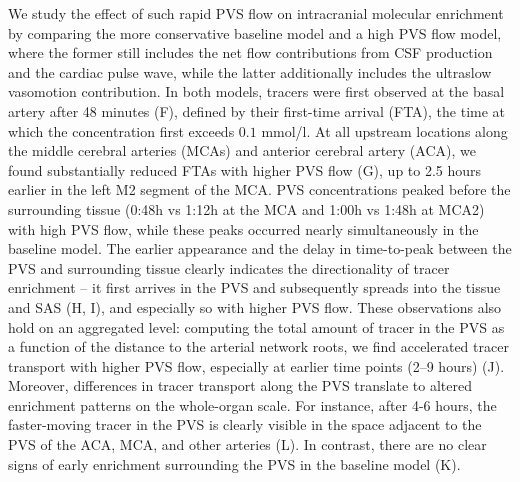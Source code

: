 \documentclass[fleqn,10pt]{wlscirep}
\begin{document}
We study the effect of such rapid PVS flow on intracranial molecular
enrichment by comparing the more conservative baseline model and a
high PVS flow model, where the former still includes the net flow
contributions from CSF production and the cardiac pulse wave, while
the latter additionally includes the ultraslow vasomotion
contribution. In both models, tracers were first observed at the basal
artery after 48 minutes (F), defined by their first-time
arrival (FTA), the time at which the concentration first exceeds $0.1$
mmol/l. At all upstream locations along the middle cerebral arteries
(MCAs) and anterior cerebral artery (ACA), we found substantially
reduced FTAs with higher PVS flow (G), up to 2.5 hours
earlier in the left M2 segment of the MCA. PVS concentrations peaked
before the surrounding tissue (0:48h vs 1:12h at the MCA and 1:00h vs
1:48h at MCA2) with high PVS flow, while these peaks occurred nearly
simultaneously in the baseline model. The earlier appearance and the
delay in time-to-peak between the PVS and surrounding tissue clearly
indicates the directionality of tracer enrichment -- it first arrives
in the PVS and subsequently spreads into the tissue and SAS
(H, I), and especially so with higher PVS flow. These
observations also hold on an aggregated level: computing the total
amount of tracer in the PVS as a function of the distance to the
arterial network roots, we find accelerated tracer transport with
higher PVS flow, especially at earlier time points (2--9 hours)
(J). Moreover, differences in tracer transport along the
PVS translate to altered enrichment patterns on the whole-organ
scale. For instance, after 4-6 hours, the faster-moving tracer in the
PVS is clearly visible in the space adjacent to the PVS of the ACA, MCA, and other arteries (L). In contrast,
there are no clear signs of early enrichment surrounding the PVS in
the baseline model (K).
\end{document}
